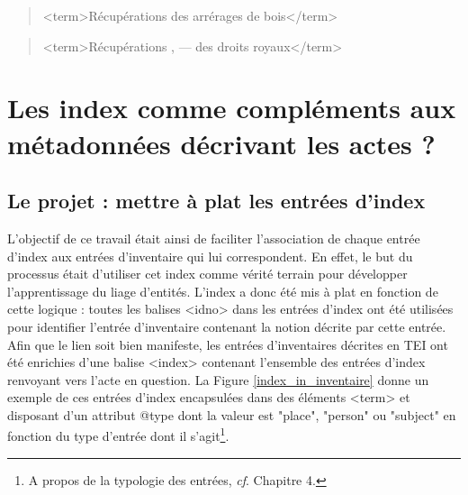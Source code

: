 \documentclass[a4paper,12pt,twoside]{book}
\begin{document}
	\begin{quotation}
		<term>Récupérations des arrérages de bois</term>
	\end{quotation}

	\begin{quotation}
		<term>Récupérations , — des droits royaux</term>
	\end{quotation}

	\section{Les index comme compléments aux métadonnées décrivant les actes ?}

	\subsection{Le projet : mettre à plat les entrées d’index}
	
	L'objectif de ce travail était ainsi de faciliter l'association de chaque entrée d'index aux entrées d'inventaire qui lui correspondent. En effet, le but du processus était d'utiliser cet index comme vérité terrain pour développer l'apprentissage du liage d'entités. L'index a donc été mis à plat en fonction de cette logique : toutes les balises <idno> dans les entrées d'index ont été utilisées pour identifier l'entrée d'inventaire contenant la notion décrite par cette entrée. Afin que le lien soit bien manifeste, les entrées d'inventaires décrites en TEI ont été enrichies d'une balise <index> contenant l'ensemble des entrées d'index renvoyant vers l'acte en question. La Figure \ref{index_in_inventaire} donne un exemple de ces entrées d'index encapsulées dans des éléments <term> et disposant d'un attribut @type dont la valeur est "place", "person" ou "subject" en fonction du type d'entrée dont il s'agit\footnote{A propos de la typologie des entrées, \textit{cf}. Chapitre 4.}.
	
\end{document}
